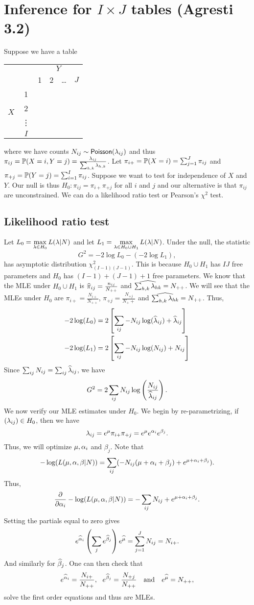 \section{Inference for $I\times J$ tables (Agresti 3.2)}
Suppose we have a table
\begin{center}
    \begin{tabular}{cc|cccc}
        &&\multicolumn{4}{c}{$Y$}\\
        &&1&2&\ldots&$J$\\
        \hline 
        \multirow{4}{*}{$X$}&1\\
        &2\\
        &\vdots \\
        &$I$
    \end{tabular}
\end{center}
where we have counts $N_{ij} \sim \mathsf{Poisson}(\lambda_{ij})$ and thus $\pi_{ij}={\mathbb{P}}(X=i,Y=j) = \frac{\lambda_{ij}}{\sum_{h,k}\lambda_{h,k}}$. Let $\pi_{i+} ={\mathbb{P}}(X=i)=\sum_{j=1}^J \pi_{ij}$ and $\pi_{+j} ={\mathbb{P}}(Y=j)=\sum_{i=1}^I \pi_{ij}$. Suppose we want to test for independence of $X$ and $Y$. Our null is thus $H_0 :\pi_{ij} =\pi_{i+}\pi_{+j}$ for all $i$ and $j$ and our alternative is that $\pi_{ij}$ are unconstrained. We can do a likelihood ratio test or Pearson's $\chi^2$ test.
\subsection{Likelihood ratio test}
Let $L_0 = \max\limits_{\lambda \in H_0}L(\lambda|N)$ and let $L_1 = \max\limits_{\lambda \in H_0 \cup H_1}L(\lambda |N)$. Under the null, the statistic
\[G^2 = -2\log L_0-(-2\log L_1 ),\]
has asymptotic distribution $\chi^2_{(I-1)(J-1)}$. This is because $H_0 \cup H_1$ has $IJ$ free parameters and $H_0$ has $(I-1)+(J-1)+1$ free parameters. We know that the MLE under $H_0 \cup H_1$ is $\widehat{\pi}_{ij} = \frac{n_{ij}}{N_{++}}$ and $\widehat{\sum_{h,k}\lambda_{hk}}=N_{++}$. We will see that the MLEs under $H_0$ are $\pi_{i+} = \frac{N_{i+}}{N_{++}}$, $\pi_{+j} = \frac{N_{+j}}{N_++}$ and $\widehat{\sum_{h,k} \lambda_{hk}}=N_{++}$. Thus,
\begin{align*}
    -2\log(L_0)& =2\left[\sum_{ij} -N_{ij}\log(\widehat{\lambda}_{ij})+\widehat{\lambda}_{ij}\right] \\
    -2\log(L_1) &=2\left[\sum_{ij} -N_{ij}\log(N_{ij})+N_{ij}\right]
\end{align*}
Since $\sum_{ij} N_{ij} = \sum_{ij}\widehat{\lambda}_{ij}$, we have
\[G^2 = 2\sum_{ij} N_{ij}\log\left(\frac{N_{ij}}{\widehat{\lambda}_{ij}}\right).\]
We now verify our MLE estimates under $H_0$. We begin by re-parametrizing, if $(\lambda_{ij}) \in H_0$, then we have 
\[\lambda_{ij} = e^\mu \pi_{i+}\pi_{+j} =e^\mu e^{{\alpha}_i} e^{\beta_j}.\]
Thus, we will optimize $\mu,{\alpha}_i$ and $\beta_j$. Note that 
\[ -\log(L(\mu,{\alpha},\beta|N)) = \sum_{ij}(-N_{ij}(\mu+{\alpha}_i+\beta_j)+e^{\mu+{\alpha}_i+\beta_j}).\]
Thus,
\[\frac{\partial}{\partial {\alpha}_i} -\log(L(\mu,{\alpha},\beta|N)) = -\sum_{ij} N_{ij}+e^{\mu+{\alpha}_i+\beta_j}.\] 
Setting the partials equal to zero gives
\[e^{\widehat{{\alpha}}_i}\left(\sum_{j} e^{\widehat{\beta}_j}\right)e^{\widehat{\mu}} = \sum_{j=1}^J N_{ij} = N_{i+}.\]
And similarly for $\widehat{\beta}_j$. One can then check that 
\[e^{\widehat{{\alpha}}_i} = \frac{N_{i+}}{N_{++}}, ~~e^{\widehat{\beta}_j} =\frac{N_{+j}}{N_{++}} ~~\text{ and } ~~ e^{\widehat{\mu}} = N_{++},\]
solve the first order equations and thus are MLEs.
